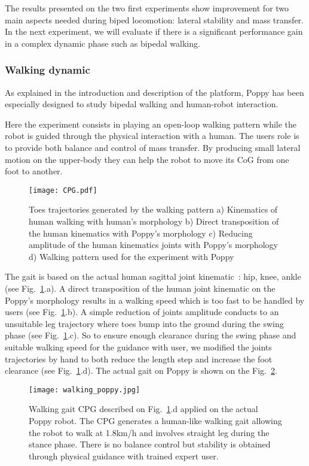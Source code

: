The results presented on the two first experiments show improvement for two main aspects needed during biped locomotion: lateral stability and mass transfer. In the next experiment, we will evaluate if there is a significant performance gain in a complex dynamic phase such as bipedal walking.


\subsubsection{Walking dynamic} %
\label{sub:walking_dynamic}

As explained in the introduction and description of the platform, Poppy has been especially designed to study bipedal walking and human-robot interaction.

Here the experiment consists in playing an open-loop walking pattern while the robot is guided through the physical interaction with a human. The users role is to provide both balance and control of mass transfer. By producing small lateral motion on the upper-body they can help the robot to move its CoG from one foot to another.

\begin{figure}[h]
    \centering
    \texttt{[image: CPG.pdf]}
    \caption{Toes trajectories generated by the walking pattern a) Kinematics of human walking
    with human's morphology b) Direct transposition of the human kinematics with Poppy's morphology
    c) Reducing amplitude of the human kinematics joints with Poppy's morphology d) Walking pattern
    used for the experiment with Poppy}
    \label{fig:CPG}
\end{figure}

The gait is based on the actual human sagittal joint kinematic~\cite{Nester2003}: hip, knee, ankle (see Fig.~\ref{fig:CPG}.a). A direct transposition of the human joint kinematic on the Poppy's morphology results in a walking speed which is too fast to be handled by users (see Fig.~\ref{fig:CPG}.b). A simple reduction of joints amplitude conducts to an unsuitable leg trajectory where toes bump into the ground during the swing phase (see Fig.~\ref{fig:CPG}.c). So to ensure enough clearance during the swing phase and suitable walking speed for the guidance with user, we modified the joints trajectories by hand to both reduce the length step and increase the foot clearance (see Fig.~\ref{fig:CPG}.d). The actual gait on Poppy is shown on the Fig.~\ref{fig:humanoids2013_cpg_on_poppy}.

\begin{figure}[h]
    \centering
    \texttt{[image: walking\_poppy.jpg]}
    \caption{Walking gait CPG described on Fig.~\ref{fig:CPG}.d applied on the actual Poppy robot.
    The CPG generates a human-like walking gait allowing the robot to walk at 1.8km/h and involves straight leg during the stance phase.
    There is no balance control but stability is obtained through physical guidance with trained expert user.}
    \label{fig:humanoids2013_cpg_on_poppy}
\end{figure}

